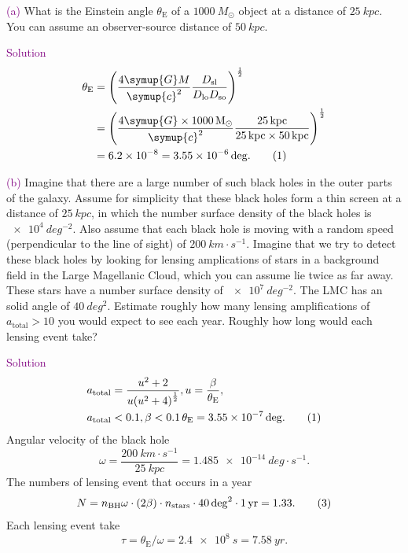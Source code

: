 \documentclass[UTF8, 12pt, a4paper, oneside, twocolumn, fontset=none]{ctexart}
\begin{document}
\hspace*{\fill}

\noindent\textcolor{purple}{(a)} What is the Einstein angle $\theta_{\mathrm{E}}$ of a $\qty{1000}{M_{\odot}}$ object at a distance of $\qty{25}{kpc}$. You can assume an observer-source distance of $\qty{50}{kpc}$.

\hspace*{\fill}

\noindent\textcolor{purple}{Solution}
\begin{align}
\theta_{\mathrm{E}}&=\mleft(\frac{4\symup{G}M}{\symup{c}^{2}}\frac{D_{\mathrm{sl}}}{D_{\mathrm{lo}}D_{\mathrm{so}}}\mright)^{\frac{1}{2}}\notag\\
&=\mleft(\frac{4\symup{G}\times\qty{1000}{M_{\odot}}}{\symup{c}^{2}}\frac{\qty{25}{kpc}}{\qty{25}{kpc}\times\qty{50}{kpc}}\mright)^{\frac{1}{2}}\notag\\
&=\qty{6.2e-8}{}=\qty{3.55e-6}{deg}.\tag{1}
\end{align}

\hspace*{\fill}

\noindent\textcolor{purple}{(b)} Imagine that there are a large number of such black holes in the outer parts of the galaxy. Assume for simplicity that these black holes form a thin screen at a distance of $\qty{25}{kpc}$, in which the number surface density of the black holes is $\qty{e4}{deg^{-2}}$. Also assume that each black hole is moving with a random speed (perpendicular to the line of sight) of $\qty{200}{km\cdot{}s^{-1}}$. Imagine that we try to detect these black holes by looking for lensing amplications of stars in a background field in the Large Magellanic Cloud, which you can assume lie twice as far away. These stars have a number surface density of $\qty{e7}{deg^{-2}}$. The LMC has an solid angle of $\qty{40}{deg^{2}}$. Estimate roughly how many lensing amplifications of $a_{\mathrm{total}}>10$ you would expect to see each year. Roughly how long would each lensing event take?

\hspace*{\fill}

\noindent\textcolor{purple}{Solution}
\begin{align}
&a_{\mathrm{total}}=\frac{u^{2}+2}{u\mleft(u^{2}+4\mright)^{\frac{1}{2}}}, u=\frac{\beta}{\theta_{\mathrm{E}}},\notag\\
&a_{\mathrm{total}}<0.1,\beta<\qty{0.1}{\theta_{\mathrm{E}}}=\qty{3.55e-7}{deg}.\tag{1}
\end{align}
Angular velocity of the black hole
\begin{equation}
\omega=\frac{\qty{200}{km\cdot{}s^{-1}}}{\qty{25}{kpc}}=\qty{1.485e-14}{deg\cdot{}s^{-1}}.\tag{2}
\end{equation}
The numbers of lensing event that occurs in a year
\begin{equation}
N=n_{\mathrm{BH}}\omega\cdot{}\mleft(2\beta\mright)\cdot{}n_{\mathrm{stars}}\cdot{}\qty{40}{deg^{2}}\cdot{}\qty{1}{yr}=1.33.\tag{3}
\end{equation}
Each lensing event take
\begin{equation}
\tau=\theta_{\mathrm{E}}/\omega=\qty{2.4e8}{s}=\qty{7.58}{yr}.\tag{4}
\end{equation}
\end{document}
